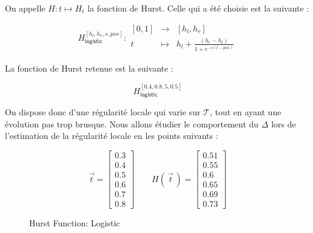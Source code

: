 \begin{minipage}{0.47\linewidth}
	On appelle $H : t \mapsto H_t$ la fonction de Hurst. Celle qui a été choisie est la suivante :

	\begin{equation*}
		H^{[h_l, h_r, s, pos]}_{\textsf{logistic}} : \begin{array}{ccc}
			[0,1] & \longrightarrow & [h_l, h_r]
			\\
			t     & \longmapsto     & h_l + \frac{(h_r - h_l)}{1 + e^{-s(t - pos)}}
		\end{array}
	\end{equation*}

	La fonction de Hurst retenue est la suivante :

	\begin{equation*}
		H^{[0.4, 0.8, 5, 0.5]}_{\textsf{logistic}}
	\end{equation*}

	On dispose donc d'une régularité locale qui varie sur $\mathcal T$, tout en ayant une évolution pas trop brusque. Nous allons étudier le comportement du $\Delta$ lors de l'estimation de la régularité locale en les points suivants :

	\begin{equation*}
		\vec t = \begin{bmatrix} 0.3 \\ 0.4 \\ 0.5 \\ 0.6 \\ 0.7 \\ 0.8 \end{bmatrix}
		\quad\quad
		H(\, \vec t \,) =
		\begin{bmatrix}
			0.51 \\ 0.55 \\ 0.6 \\ 0.65 \\ 0.69 \\ 0.73
		\end{bmatrix}
	\end{equation*}

\end{minipage}
\hfill
\begin{minipage}{0.47\linewidth}
	\begin{figure}[H]
		\centering
		\caption{Hurst Function: Logistic}
		\label{plot:hurst-logistic}
	\end{figure}
\end{minipage}
